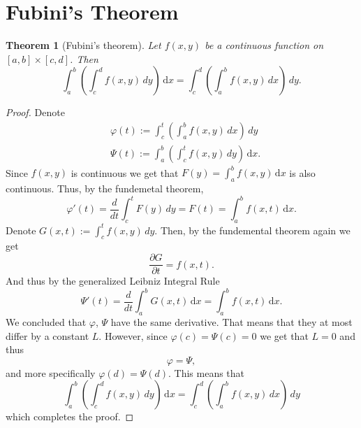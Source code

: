 \documentclass[11pt,a4paper]{article}
\theoremstyle{definition}
\theoremstyle{plain}
\newtheorem{theorem}{Theorem}[section]
\newcommand\dx    {\,\mathrm{d}x}
\begin{document}
  \newpage

  \section{Fubini's Theorem}
  \begin{theorem}[Fubini's theorem]
    Let $f(x,y)$ be a continuous function on $[a,b] \times [c,d]$.
    Then
    \[
      \int_a^b\left(\int_c^d{f(x,y)\, dy}\right)\dx
    = \int_c^d\left(\int_a^b{f(x,y)\, dx}\right)\,dy.
    \]
  \end{theorem}
  \begin{proof}
    Denote
    \begin{align*}
      &\varphi(t) := \int_c^t\left(\int_a^b{f(x,y)\, dx}\right)\,dy \\
      &\Psi(t) := \int_a^b\left(\int_c^t{f(x,y)\, dy}\right)\dx.
    \end{align*}
    Since $f(x,y)$ is continuous we get that $F(y) = \int_a^b{f(x,y)\dx}$ is 
    also continuous. Thus, by the fundemetal theorem,
    \[
      \varphi'(t) = \frac{d}{dt} \int_{c}^{t} F(y)\,dy =
      F(t) = \int_{a}^{b} f(x,t)\dx.
    \]
    Denote $G(x,t) := \int_c^t{f(x,y)\,dy}$.
    Then, by the fundemental theorem again we get
    \[
      \frac{\partial G}{\partial t} = f(x,t).
    \]
    And thus by the generalized Leibniz Integral Rule
    \[
      \Psi'(t) = \frac{d}{dt}\int_a^b{G(x,t)\dx} = \int_a^b{f(x,t)\dx}.
    \]
    We concluded that $\varphi$, $\Psi$ have the same derivative.
    That means that they at most differ by a constant $L$.
    However, since $\varphi(c) = \Psi(c) = 0$ we get that $L = 0$ and thus
    \[
      \varphi = \Psi,
    \]
    and more specifically $\varphi(d) = \Psi(d)$.
    This means that
    \[
      \int_a^b\left(\int_c^d{f(x,y)\, dy}\right)\dx
    = \int_c^d\left(\int_a^b{f(x,y)\, dx}\right)\,dy
    \]
    which completes the proof.
  \end{proof}

  \newpage
  
\end{document}
